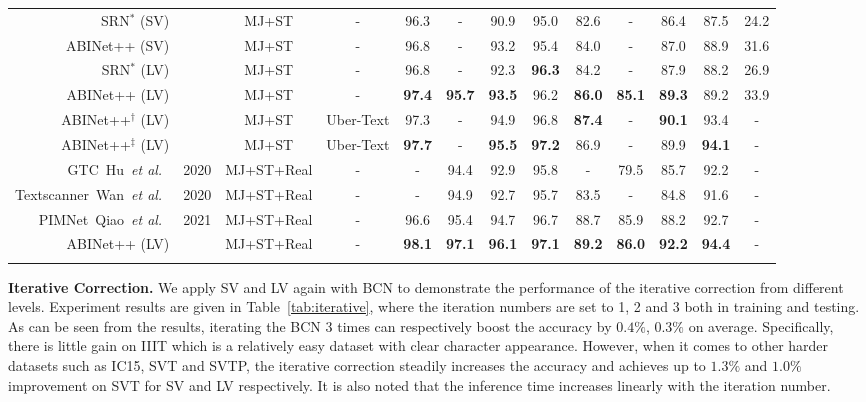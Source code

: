 \documentclass[10pt,journal,compsoc]{IEEEtran}
\def\etal{{\it et al.}\xspace}
\newlength\savedwidth
\newcommand\whline{\noalign{\global\savedwidth\arrayrulewidth
                           \global\arrayrulewidth 0.8pt}\hline
                  \noalign{\global\arrayrulewidth\savedwidth}}
\begin{document}
\begin{table*}[htp]
\begin{center}
{\begin{tabular}{r|c|c|c|c|c|c|c|c|c|c|c|c}
   \hline
   SRN$^*$ (SV) & &  MJ+ST & - & 96.3 & - & 90.9 & 95.0 & 82.6 & - & 86.4 & 87.5 & 24.2\\
   ABINet++ (SV) & & MJ+ST & - & 96.8 & - & 93.2 &  95.4 & 84.0 & - &  87.0 & 88.9 & 31.6 \\  
   SRN$^*$ (LV) & &  MJ+ST & - & 96.8 & - & 92.3 & \bf{96.3} & 84.2 & - & 87.9 & 88.2 & 26.9 \\
   ABINet++ (LV) & & MJ+ST & - & \bf{97.4} & \bf{95.7} & \bf{93.5} & 96.2 & \bf{86.0} & \bf{85.1} & \bf{89.3}  & 89.2 & 33.9 \\
   \hline
   ABINet++$^\dag$ (LV) & & MJ+ST & Uber-Text & 97.3 & - & 94.9 & 96.8 & \bf{87.4} & - & \bf{90.1} & 93.4 & - \\
   ABINet++$^\ddag$ (LV) & & MJ+ST & Uber-Text & \bf{97.7} & - & \bf{95.5} & \bf{97.2} & 86.9 & - & 89.9  & \bf{94.1} & - \\
   \hline
   GTC~Hu~\etal~\cite{hu2020gtc} & 2020 & MJ+ST+Real & - & - & 94.4 & 92.9 & 95.8 & - & 79.5 & 85.7 & 92.2 & - \\
   Textscanner~Wan~\etal~\cite{wan2019textscanner} & 2020 & MJ+ST+Real & - & - & 94.9 & 92.7 & 95.7 & 83.5 & - & 84.8 & 91.6 & - \\
   PIMNet~Qiao~\etal~\cite{qiao2021pimnet} & 2021 & MJ+ST+Real & - & 96.6 & 95.4 & 94.7 & 96.7 & 88.7 & 85.9 & 88.2 & 92.7 & - \\
   ABINet++ (LV) & & MJ+ST+Real & - & \bf{98.1} & \bf{97.1} & \bf{96.1} & \bf{97.1} & \bf{89.2} & \bf{86.0} & \bf{92.2}  & \bf{94.4} & - \\
   \whline
   \end{tabular}}
   \end{center}
   \vspace{-1.5em}
 \end{table*}


\textbf{Iterative Correction.} We apply SV and LV again with BCN to demonstrate the performance of the iterative correction from different levels. Experiment results are given in Table~\ref{tab:iterative}, where the iteration numbers are set to 1, 2 and 3 both in training and testing. As can be seen from the results, iterating the BCN 3 times can respectively boost the accuracy by $0.4\%$, $0.3\%$ on average. Specifically, there is little gain on IIIT which is a relatively easy dataset with clear character appearance. However, when it comes to other harder datasets such as IC15, SVT and SVTP, the iterative correction steadily increases the accuracy and achieves up to $1.3\%$ and $1.0\%$ improvement on SVT for SV and LV respectively. It is also noted that the inference time increases linearly with the iteration number.
\end{document}
